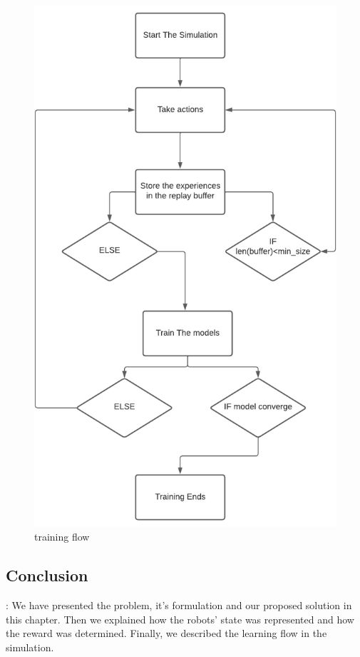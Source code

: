 \documentclass[12pt]{extarticle}
\begin{document}
 \begin{figure}[h]  
\centering
\includegraphics[scale=1.8]{training_workflow3}
\caption[training flow]{training flow}
\end{figure}

\subsection{Conclusion}:
We have presented the problem, it's formulation and our proposed solution in this chapter. Then we explained how the robots' state was represented and how the reward was determined. Finally, we described the learning flow in the simulation.
\end{document}
